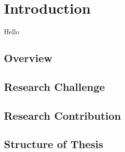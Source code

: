 

\chapter{Introduction} \label{Chapter:Introduction}
Hello

\section{Overview}
\section{Research Challenge}
\section{Research Contribution}
\section{Structure of Thesis}